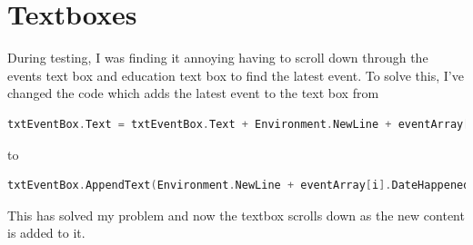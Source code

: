 \section{Textboxes}
During testing, I was finding it annoying having to scroll down through the events text box and education text box to find the latest event. To solve this, I've changed the code which adds the latest event to the text box from 
\begin{lstlisting}[language=c, style=csharp, caption=Old method of adding text to textbox]
txtEventBox.Text = txtEventBox.Text + Environment.NewLine + eventArray[i].DateHappened.ToShortDateString() + " - " +  eventArray[i].Description;
\end{lstlisting}
to
\begin{lstlisting}[language=c, style=csharp, caption=New method of adding text to a textbox]
txtEventBox.AppendText(Environment.NewLine + eventArray[i].DateHappened.ToShortDateString() + " - " + eventArray[i].Description);
\end{lstlisting}
This has solved my problem and now the textbox scrolls down as the new content is added to it.

